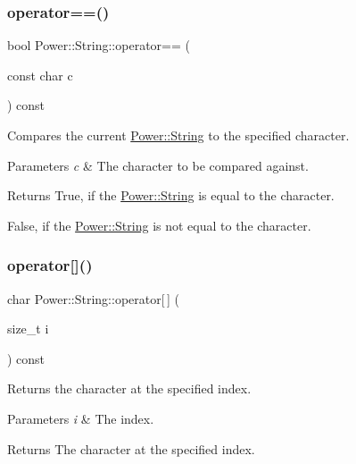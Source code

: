 \subsubsection{\texorpdfstring{operator==()}{operator==()}\hspace{0.1cm}{\footnotesize\ttfamily [3/3]}}
{\footnotesize\ttfamily bool Power\+::\+String\+::operator== (\begin{DoxyParamCaption}\item[{const char}]{c }\end{DoxyParamCaption}) const\hspace{0.3cm}{\ttfamily [inline]}}



Compares the current \hyperlink{class_power_1_1_string}{Power\+::\+String} to the specified character. 


\begin{DoxyParams}{Parameters}
{\em c} & The character to be compared against. \\
\hline
\end{DoxyParams}
\begin{DoxyReturn}{Returns}
True, if the \hyperlink{class_power_1_1_string}{Power\+::\+String} is equal to the character. 

False, if the \hyperlink{class_power_1_1_string}{Power\+::\+String} is not equal to the character. 
\end{DoxyReturn}
\mbox{\label{class_power_1_1_string_a9205107e5478a19d5f54cf0db0677be4}} 
\subsubsection{\texorpdfstring{operator[]()}{operator[]()}}
{\footnotesize\ttfamily char Power\+::\+String\+::operator\mbox{[}$\,$\mbox{]} (\begin{DoxyParamCaption}\item[{size\+\_\+t}]{i }\end{DoxyParamCaption}) const\hspace{0.3cm}{\ttfamily [inline]}}



Returns the character at the specified index. 


\begin{DoxyParams}{Parameters}
{\em i} & The index. \\
\hline
\end{DoxyParams}
\begin{DoxyReturn}{Returns}
The character at the specified index. 
\end{DoxyReturn}
\mbox{\label{class_power_1_1_string_a724a2049b4f2694049f37ce63f254c94}} 
